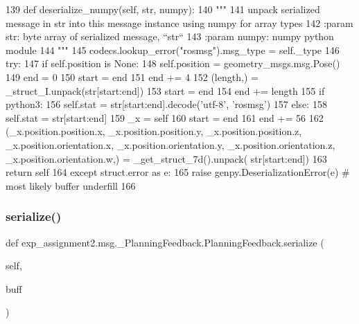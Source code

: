 \begin{DoxyCode}
139   \textcolor{keyword}{def }deserialize\_numpy(self, str, numpy):
140     \textcolor{stringliteral}{"""}
141 \textcolor{stringliteral}{    unpack serialized message in str into this message instance using numpy for array types}
142 \textcolor{stringliteral}{    :param str: byte array of serialized message, ``str``}
143 \textcolor{stringliteral}{    :param numpy: numpy python module}
144 \textcolor{stringliteral}{    """}
145     codecs.lookup\_error(\textcolor{stringliteral}{"rosmsg"}).msg\_type = self.\_type
146     \textcolor{keywordflow}{try}:
147       \textcolor{keywordflow}{if} self.position \textcolor{keywordflow}{is} \textcolor{keywordtype}{None}:
148         self.position = geometry\_msgs.msg.Pose()
149       end = 0
150       start = end
151       end += 4
152       (length,) = \_struct\_I.unpack(str[start:end])
153       start = end
154       end += length
155       \textcolor{keywordflow}{if} python3:
156         self.stat = str[start:end].decode(\textcolor{stringliteral}{'utf-8'}, \textcolor{stringliteral}{'rosmsg'})
157       \textcolor{keywordflow}{else}:
158         self.stat = str[start:end]
159       \_x = self
160       start = end
161       end += 56
162       (\_x.position.position.x, \_x.position.position.y, \_x.position.position.z, \_x.position.orientation.x, 
      \_x.position.orientation.y, \_x.position.orientation.z, \_x.position.orientation.w,) = \_get\_struct\_7d().unpack(
      str[start:end])
163       \textcolor{keywordflow}{return} self
164     \textcolor{keywordflow}{except} struct.error \textcolor{keyword}{as} e:
165       \textcolor{keywordflow}{raise} genpy.DeserializationError(e)  \textcolor{comment}{# most likely buffer underfill}
166 
\end{DoxyCode}
\mbox{\label{classexp__assignment2_1_1msg_1_1__PlanningFeedback_1_1PlanningFeedback_acfd4e59e0eecf15fa6aac79255ef976d}} 
\subsubsection{\texorpdfstring{serialize()}{serialize()}}
{\footnotesize\ttfamily def exp\+\_\+assignment2.\+msg.\+\_\+\+Planning\+Feedback.\+Planning\+Feedback.\+serialize (\begin{DoxyParamCaption}\item[{}]{self,  }\item[{}]{buff }\end{DoxyParamCaption})}

